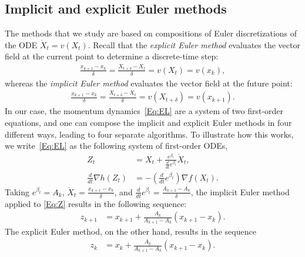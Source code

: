 \documentclass[11pt]{article}
\theoremstyle{plain}
\begin{document}
 \subsection{Implicit and explicit Euler methods}
The methods that we study are based on compositions of Euler discretizations of the ODE $ \dot X_t = v(X_t)$.  Recall that the \emph{explicit Euler method} evaluates the vector field at the current point to determine a discrete-time step:
\begin{align*}
\frac{x_{k+1} - x_k}{\delta} = \frac{X_{t+ \delta} - X_t}{\delta}= v(X_t) = v(x_k),
\end{align*}
whereas the \emph{implicit Euler method} evaluates the vector field at the future point:
\begin{align*}
\frac{x_{k+1} - x_k}{\delta} = \frac{X_{t+ \delta} - X_t}{\delta}= v(X_{t+\delta}) = v(x_{k+1}).
\end{align*}
In our case, the momentum dynamics~\eqref{Eq:EL} are a system of two first-order equations, and one can compose the implicit and explicit Euler methods in four different ways, leading to four separate algorithms. To illustrate how this works, we write~\eqref{Eq:EL} as the following system of first-order ODEs,
 \begin{subequations}\label{Eq:DynaBeta}
 \begin{align}
 Z_t &= X_t + \frac{e^{\beta_t}}{\frac{d}{dt} e^{\beta_t}} \dot X_t, \label{Eq:Z}\\
 \frac{d}{dt} \nabla h(Z_t) &= -\left(\frac{d}{dt}e^{\beta_t}\right) \nabla f(X_t). \label{Eq:X}
 \end{align}
 \end{subequations}
 Taking $e^{\beta_t} = A_k$, $\dot X_t = \frac{x_{k+1} - x_k}{\delta}$, and $\frac{d}{dt}e^{\beta_t} =\frac{A_{k+1} - A_k}{\delta}$, the implicit Euler method applied to \eqref{Eq:Z} results in the following sequence:
 \begin{align*}
 z_{k+1} &=  x_{k+1} + \frac{A_k}{A_{k+1} - A_k} (x_{k+1} - x_k).
 \end{align*}
The explicit Euler method, on the other hand, results in the sequence 
\begin{align*}
 z_{k} &=  x_{k} + \frac{A_k}{A_{k+1} - A_k} (x_{k+1} - x_k).
\end{align*}
\end{document}
